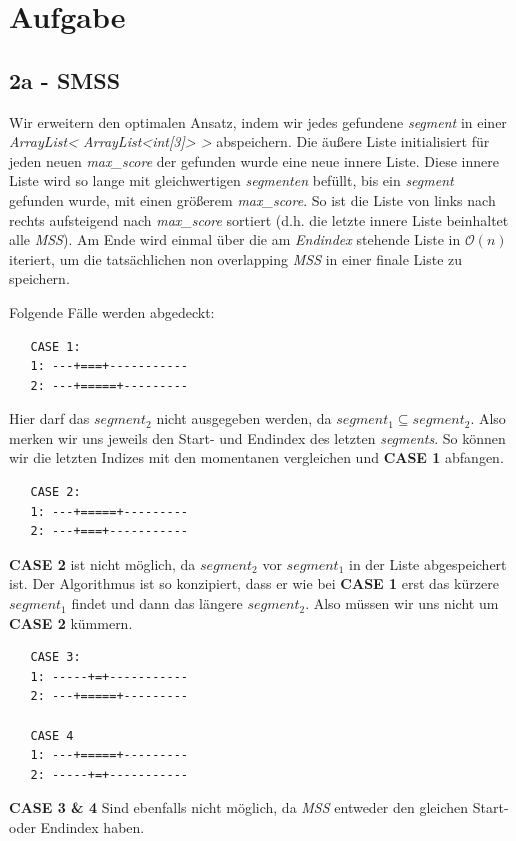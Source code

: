 \documentclass[10pt]{article}
\begin{document}
\section{Aufgabe}

\subsection{2a - SMSS}\label{sec:2a}
Wir erweitern den optimalen Ansatz, indem wir jedes gefundene \textit{segment} in einer \textit{ArrayList< ArrayList<int[3]> >} abspeichern.
Die äu\ss ere Liste initialisiert für jeden neuen \textit{max\_score} der gefunden wurde eine neue innere Liste. Diese innere
Liste wird so lange mit gleichwertigen \textit{segmenten} befüllt, bis ein \textit{segment} gefunden wurde, mit einen grö\ss erem
\textit{max\_score}. So ist die Liste von links nach rechts aufsteigend nach \textit{max\_score} sortiert (d.h. die letzte innere Liste beinhaltet alle \textit{MSS}).
Am Ende wird einmal über die am \textit{Endindex} stehende Liste in $\mathcal{O}(n)$ iteriert, um die tatsächlichen non overlapping
\textit{MSS} in einer finale Liste zu speichern.

Folgende Fälle werden abgedeckt: \\
\begin{verbatim} 
   CASE 1:
   1: ---+===+-----------
   2: ---+=====+---------
\end{verbatim}
Hier darf das $segment_{2}$ nicht ausgegeben werden, da $segment_{1} \subseteq segment_2$. Also merken wir uns
jeweils den Start- und Endindex des letzten \textit{segments}. So können wir die letzten Indizes mit den 
momentanen vergleichen und \textbf{CASE 1} abfangen. 

\begin{verbatim}
   CASE 2:
   1: ---+=====+---------
   2: ---+===+-----------
\end{verbatim}
\textbf{CASE 2} ist nicht möglich, da $segment_{2}$ vor $segment_{1}$ in der Liste abgespeichert ist.
Der Algorithmus ist so konzipiert, dass er wie bei \textbf{CASE 1} erst das kürzere $segment_{1}$ findet und dann das
längere $segment_{2}$. Also müssen wir uns nicht um \textbf{CASE 2} kümmern.
\begin{verbatim}
   CASE 3:
   1: -----+=+-----------
   2: ---+=====+---------

   CASE 4
   1: ---+=====+---------
   2: -----+=+-----------
\end{verbatim}
\textbf{CASE 3 \& 4} Sind ebenfalls nicht möglich, da \textit{MSS} entweder den gleichen Start- oder Endindex haben.
\end{document}
